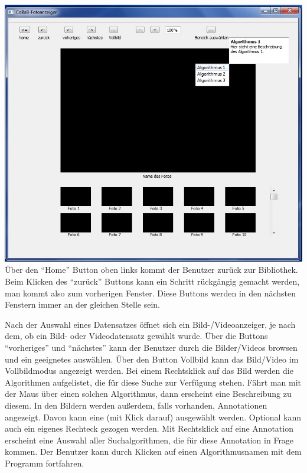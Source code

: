 \includegraphics[width=1\linewidth]{img/Fotoanzeiger}
Über den \enquote{Home} Button oben links kommt der Benutzer zurück zur Bibliothek. Beim Klicken des \enquote{zurück} Buttons kann ein Schritt rückgängig gemacht werden, man kommt also zum vorherigen Fenster. Diese Buttons werden in den nächsten Fenstern immer an der gleichen Stelle sein.

Nach der Auswahl eines Datensatzes öffnet sich ein Bild-/Videoanzeiger, je nach dem, ob ein Bild- oder Videodatensatz gewählt wurde. Über die Buttons \enquote{vorheriges} und \enquote{nächstes} kann der Benutzer durch die Bilder/Videos browsen und ein geeignetes auswählen. Über den Button Vollbild kann das Bild/Video im Vollbildmodus angezeigt werden.
Bei einem Rechtsklick auf das Bild werden die Algorithmen aufgelistet, die für diese Suche zur Verfügung stehen. Fährt man mit der Maus über einen solchen Algorithmus, dann erscheint eine Beschreibung zu diesem.
In den Bildern werden außerdem, falls vorhanden, Annotationen angezeigt. Davon kann eine (mit Klick darauf) ausgewählt werden. Optional kann auch ein eigenes Rechteck gezogen werden. Mit Rechtsklick auf eine Annotation erscheint eine Auswahl aller Suchalgorithmen, die für diese Annotation in Frage kommen. Der Benutzer kann durch Klicken auf einen Algorithmusnamen mit dem Programm fortfahren.

